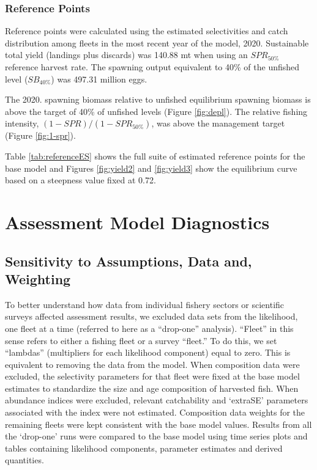 \documentclass[
  english,
  a4paper,
]{article}
\begin{document}
\hypertarget{reference-points-1}{%
\subsubsection{Reference Points}\label{reference-points-1}}

Reference points were calculated using the estimated selectivities and catch distribution among fleets in the most recent year of the model, 2020.
Sustainable total yield (landings plus discards) was
140.88 mt when using an \(SPR_{50\%}\)
reference harvest rate. The spawning output equivalent to 40\% of the unfished level (\(SB_{40\%}\)) was 497.31
million eggs.

The 2020. spawning biomass relative to unfished equilibrium spawning biomass is above the target of 40\% of unfished levels (Figure \ref{fig:depl}).
The relative fishing intensity, \((1-SPR)/(1-SPR_{50\%})\), was above the management target (Figure \ref{fig:1-spr}).

Table \ref{tab:referenceES} shows the full suite of estimated reference points for the base model and Figures \ref{fig:yield2} and \ref{fig:yield3} show the equilibrium curve based on a steepness value fixed at 0.72.

\hypertarget{assessment-model-diagnostics}{%
\section{Assessment Model Diagnostics}\label{assessment-model-diagnostics}}

\hypertarget{sensitivity-to-assumptions-data-and-weighting}{%
\subsection{Sensitivity to Assumptions, Data and, Weighting}\label{sensitivity-to-assumptions-data-and-weighting}}

To better understand how data from individual fishery sectors or scientific surveys affected assessment results, we excluded data sets from the likelihood, one fleet at a time (referred to here as a ``drop-one'' analysis). ``Fleet'' in this sense refers to either a fishing fleet or a survey ``fleet.'' To do this, we set ``lambdas'' (multipliers for each likelihood component) equal to zero. This is equivalent to removing the data from the model. When composition data were excluded, the selectivity parameters for that fleet were fixed at the base model estimates to standardize the size and age composition of harvested fish. When abundance indices were excluded, relevant catchability and `extraSE' parameters associated with the index were not estimated. Composition data weights for the remaining fleets were kept consistent with the base model values. Results from all the `drop-one' runs were compared to the base model using time series plots and tables containing likelihood components, parameter estimates and derived quantities.
\end{document}
